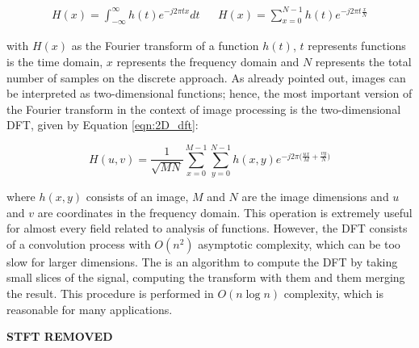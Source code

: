 \begin{align}
\label{eqn:fourier_transform}
    H(x) = \int_{-\infty}^{\infty}h(t)e^{-j2 \pi tx}dt
    &&
    H(x) = \sum_{x=0}^{N-1}h(t)e^{-j2 \pi t \frac{x}{N}}
\end{align}

\noindent with $H(x)$ as the Fourier transform of a function $h(t)$, $t$ represents functions is the time domain, $x$ represents the frequency domain and $N$ represents the total number of samples on the discrete approach. As already pointed out, images can be interpreted as two-dimensional functions; hence, the most important version of the Fourier transform in the context of image processing is the two-dimensional DFT, given by Equation \ref{eqn:2D_dft}:

\begin{equation}
\label{eqn:2D_dft}
    H(u,v) = \frac{1}{\sqrt{MN}}\sum_{x=0}^{M-1}\sum_{y=0}^{N-1}h(x,y)e^{-j2 \pi \big(\frac{ux}{M} + \frac{vy}{N}\big)}
\end{equation}

\noindent where $h(x,y)$ consists of an image, $M$ and $N$ are the image dimensions and $u$ and $v$ are coordinates in the frequency domain. This operation is extremely useful for almost every field related to analysis of functions. However, the DFT consists of a convolution process with $O(n^{2})$ asymptotic complexity, which can be too slow for larger dimensions. The  is an algorithm to compute the DFT by taking small slices of the signal, computing the transform with them and them merging the result. This procedure is performed in $O(n \log n)$ complexity, which is reasonable for many applications.


\textbf{STFT REMOVED}





